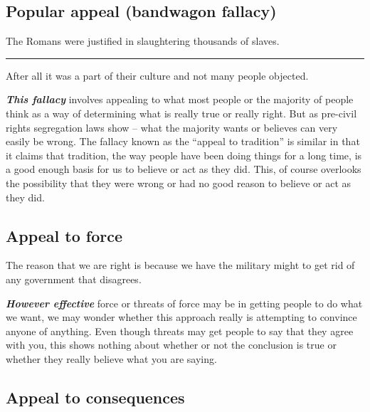 \documentclass[]{book}
\makeatletter
\newenvironment{kframe}{%
\medskip{}
\setlength{\fboxsep}{.8em}
 \def\at@end@of@kframe{}%
 \ifinner\ifhmode%
  \def\at@end@of@kframe{\end{minipage}}%
  \begin{minipage}{\columnwidth}%
 \fi\fi%
 \def\FrameCommand##1{\hskip\@totalleftmargin \hskip-\fboxsep
 \colorbox{shadecolor}{##1}\hskip-\fboxsep
     \hskip-\linewidth \hskip-\@totalleftmargin \hskip\columnwidth}%
 \MakeFramed {\advance\hsize-\width
   \@totalleftmargin\z@ \linewidth\hsize
   \@setminipage}}%
 {\par\unskip\endMakeFramed%
 \at@end@of@kframe}
\newenvironment{rmdblock}[1]
  {
  \begin{itemize}
  \renewcommand{\labelitemi}{
    \raisebox{-.7\height}[0pt][0pt]{
      {\setkeys{Gin}{width=3em,keepaspectratio}\texttt{[image: img/\#1]}}
    }
  }
  \setlength{\fboxsep}{1em}
  \begin{kframe}
  \item
  }
  {
  \end{kframe}
  \end{itemize}
  }
\newenvironment{rmdwarning}
  {\begin{rmdblock}{warning}}
  {\end{rmdblock}}
\makeatother
\begin{document}
\hypertarget{popular-appeal-bandwagon-fallacy}{%
\subsection*{Popular appeal (bandwagon fallacy)}\label{popular-appeal-bandwagon-fallacy}}


\begin{rmdwarning}
The Romans were justified in slaughtering thousands of slaves.

\begin{center}\rule{0.5\linewidth}{\linethickness}\end{center}

After all it was a part of their culture and not many people objected.
\end{rmdwarning}

\textbf{\emph{This fallacy}} involves appealing to what most people or the majority of people think as a way of determining what is really true or really right. But as pre-civil rights segregation laws show -- what the majority wants or believes can very easily be wrong. The fallacy known as the ``appeal to tradition'' is similar in that it claims that tradition, the way people have been doing things for a long time, is a good enough basis for us to believe or act as they did. This, of course overlooks the possibility that they were wrong or had no good reason to believe or act as they did.

\hypertarget{appeal-to-force}{%
\subsection*{Appeal to force}\label{appeal-to-force}}


\begin{rmdwarning}
The reason that we are right is because we have the military might to
get rid of any government that disagrees.
\end{rmdwarning}

\textbf{\emph{However effective}} force or threats of force may be in getting people to do what we want, we may wonder whether this approach really is attempting to convince anyone of anything. Even though threats may get people to say that they agree with you, this shows nothing about whether or not the conclusion is true or whether they really believe what you are saying.

\hypertarget{appeal-to-consequences}{%
\subsection*{Appeal to consequences}\label{appeal-to-consequences}}
\end{document}
